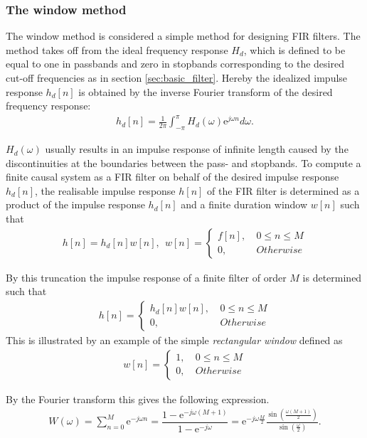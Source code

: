 \subsubsection{The window method}
The window method is considered a simple method for designing FIR filters. The method takes off from the ideal frequency response $H_d$, which is defined to be equal to one in passbands and zero in stopbands corresponding to the desired cut-off frequencies as in section \ref{sec:basic_filter}. Hereby the idealized impulse response $h_d[n]$ is obtained by the inverse Fourier transform of the desired frequency response:
\begin{align*}
h_d[n]=\frac{1}{2\pi}\int_{-\pi}^{\pi} H_d(\omega)\text{e}^{j\omega n} d\omega.
\end{align*}

$H_d(\omega)$ usually results in an impulse response of infinite length caused by the discontinuities at the boundaries between the pass- and stopbands. To compute a finite causal system as a FIR filter on behalf of the desired impulse response $h_d[n]$, the realisable impulse response $h[n]$ of the FIR filter is determined as a product of the impulse response $h_d[n]$ and a finite duration window $w[n]$ such that
\begin{align}
h[n]=h_d[n]w[n], \ \ w[n] =
\left\{ \begin{matrix}
f[n], &\ 0 \leq n \leq M \\
0, &\ Otherwise
\end{matrix}\right.
\end{align}

By this truncation the impulse response of a finite filter of order $M$ is determined such that
\begin{align}
h[n]= 
\left\{ \begin{matrix}
h_d[n]w[n], &\ 0 \leq n \leq M \\
0, &\ Otherwise
\end{matrix}\right.
\end{align}
This is illustrated by an example of the simple \textit{rectangular window} defined as 
\begin{align}
w[n] =
\left\{ \begin{matrix}
1, &\ 0 \leq n \leq M \\
0, &\ Otherwise
\end{matrix}\right.
\end{align}

By the Fourier transform this gives the following expression.
\begin{align}
W\left(\omega\right) = \sum_{n=0}^{M} \text{e}^{-j\omega n} = \dfrac{1 - \text{e}^{-j\omega(M+1)}}{1 - \text{e}^{-j\omega}} = \text{e}^{-j\omega \frac{M}{2}} \frac{ \sin \left( \frac{\omega \left( M+1 \right)}{2} \right)}{\sin \left( \frac{\omega}{2} \right)}.
\end{align}


